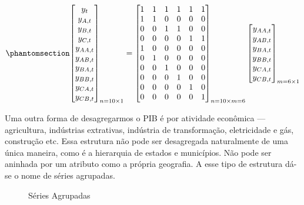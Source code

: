 \documentclass[
  12pt,
  twoside,
  openright,
  a4paper,
  chapter=TITLE,
  section=TITLE,
  brazil]{abntex2}
\begin{document}
\begin{equation}\phantomsection\label{eq-matriz_hierarquia}{
\begin{bmatrix}
    y_{t} \\
    y_{A, t} \\
    y_{B, t} \\
    y_{C, t} \\
    y_{AA, t} \\
    y_{AB, t} \\
    y_{BA, t} \\
    y_{BB, t} \\
    y_{CA, t} \\
    y_{CB, t}
\end{bmatrix}_{n=10 \times 1}
=
\begin{bmatrix}
    1 & 1 & 1 & 1 & 1 & 1 \\
    1 & 1 & 0 & 0 & 0 & 0 \\
    0 & 0 & 1 & 1 & 0 & 0 \\
    0 & 0 & 0 & 0 & 1 & 1 \\
    1 & 0 & 0 & 0 & 0 & 0 \\
    0 & 1 & 0 & 0 & 0 & 0 \\
    0 & 0 & 1 & 0 & 0 & 0 \\
    0 & 0 & 0 & 1 & 0 & 0 \\
    0 & 0 & 0 & 0 & 1 & 0 \\
    0 & 0 & 0 & 0 & 0 & 1
\end{bmatrix}_{n=10 \times m=6}
\begin{bmatrix}
    y_{AA, t} \\
    y_{AB, t} \\
    y_{BA, t} \\
    y_{BB, t} \\
    y_{CA, t} \\
    y_{CB, t}
\end{bmatrix}_{m=6 \times 1}
}\end{equation}

Uma outra forma de desagregarmos o PIB é por atividade econômica ---
agricultura, indústrias extrativas, indústria de transformação,
eletricidade e gás, construção etc. Essa estrutura não pode ser
desagregada naturalmente de uma única maneira, como é a hierarquia de
estados e municípios. Não pode ser aninhada por um atributo como a
própria geografia. A esse tipo de estrutura dá-se o nome de séries
agrupadas.

\begin{figure}


\caption{\label{fig-a}Séries Agrupadas}

\end{figure}%
\end{document}

